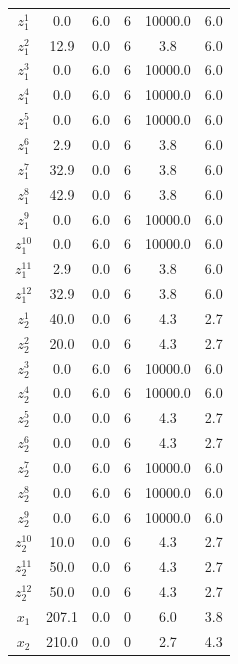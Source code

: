 \documentclass[a4paper,11pt]{article}
\begin{document}
\begin{longtable}{cccccc}
$z_1^1$ & 0.0 & 6.0 & 6 & 10000.0 & 6.0\\
\addlinespace
$z_1^2$ & 12.9 & 0.0 & 6 & 3.8 & 6.0\\
$z_1^3$ & 0.0 & 6.0 & 6 & 10000.0 & 6.0\\
$z_1^4$ & 0.0 & 6.0 & 6 & 10000.0 & 6.0\\
$z_1^5$ & 0.0 & 6.0 & 6 & 10000.0 & 6.0\\
$z_1^6$ & 2.9 & 0.0 & 6 & 3.8 & 6.0\\
\addlinespace
$z_1^7$ & 32.9 & 0.0 & 6 & 3.8 & 6.0\\
$z_1^8$ & 42.9 & 0.0 & 6 & 3.8 & 6.0\\
$z_1^9$ & 0.0 & 6.0 & 6 & 10000.0 & 6.0\\
$z_1^{10}$ & 0.0 & 6.0 & 6 & 10000.0 & 6.0\\
$z_1^{11}$ & 2.9 & 0.0 & 6 & 3.8 & 6.0\\
\addlinespace
$z_1^{12}$ & 32.9 & 0.0 & 6 & 3.8 & 6.0\\
$z_2^1$ & 40.0 & 0.0 & 6 & 4.3 & 2.7\\
$z_2^2$ & 20.0 & 0.0 & 6 & 4.3 & 2.7\\
$z_2^3$ & 0.0 & 6.0 & 6 & 10000.0 & 6.0\\
$z_2^4$ & 0.0 & 6.0 & 6 & 10000.0 & 6.0\\
\addlinespace
$z_2^5$ & 0.0 & 0.0 & 6 & 4.3 & 2.7\\
$z_2^6$ & 0.0 & 0.0 & 6 & 4.3 & 2.7\\
$z_2^7$ & 0.0 & 6.0 & 6 & 10000.0 & 6.0\\
$z_2^8$ & 0.0 & 6.0 & 6 & 10000.0 & 6.0\\
$z_2^9$ & 0.0 & 6.0 & 6 & 10000.0 & 6.0\\
\addlinespace
$z_2^{10}$ & 10.0 & 0.0 & 6 & 4.3 & 2.7\\
$z_2^{11}$ & 50.0 & 0.0 & 6 & 4.3 & 2.7\\
$z_2^{12}$ & 50.0 & 0.0 & 6 & 4.3 & 2.7\\
$x_1$ & 207.1 & 0.0 & 0 & 6.0 & 3.8\\
$x_2$ & 210.0 & 0.0 & 0 & 2.7 & 4.3\\*
\end{longtable}
\endgroup{}
\end{document}
